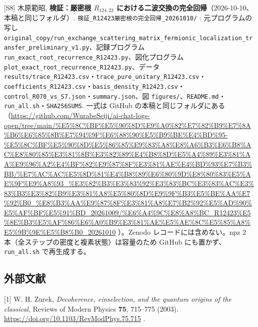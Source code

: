 \documentclass[
  a4paper,
]{ltjsarticle}
\begin{document}
{[}S8{]} 木原範昭, \textbf{検証：厳密根 \(R_{124,23}\)
における二波交換の完全回帰}（2026-10-10、本稿と同じフォルダ）.
\texttt{検証\_\allowbreak{}R12423厳密根の完全回帰\_\allowbreak{}20261010/\allowbreak{}} : 元プログラムの写し
\texttt{original\_\allowbreak{}copy/\allowbreak{}run\_\allowbreak{}exchange\_\allowbreak{}scattering\_\allowbreak{}matrix\_\allowbreak{}fermionic\_\allowbreak{}localization\_\allowbreak{}transfer\_\allowbreak{}preliminary\_\allowbreak{}v1.py}、記録プログラム
\texttt{run\_\allowbreak{}exact\_\allowbreak{}root\_\allowbreak{}recurrence\_\allowbreak{}R12423.py}、図化プログラム
\texttt{plot\_\allowbreak{}exact\_\allowbreak{}root\_\allowbreak{}recurrence\_\allowbreak{}R12423.py}、データ
\texttt{results/\allowbreak{}trace\_\allowbreak{}R12423.csv}・\texttt{trace\_\allowbreak{}pure\_\allowbreak{}unitary\_\allowbreak{}R12423.csv}・\texttt{coefficients\_\allowbreak{}R12423.csv}・\texttt{basis\_\allowbreak{}density\_\allowbreak{}R12423.csv}・\texttt{control\_\allowbreak{}R070\_\allowbreak{}vs\_\allowbreak{}S7.json}・\texttt{summary.json}、図
\texttt{figures/\allowbreak{}}、\texttt{README.md}・\texttt{run\_\allowbreak{}all.sh}・\texttt{SHA256SUMS}.
一式は GitHub
の本稿と同じフォルダにある（\url{https://github.com/WurabeSeiji/ai-chat-logs-open/tree/main/\%E5\%8C\%BF\%E5\%90\%8D\%E9\%A0\%82\%E7\%82\%B9\%E7\%8A\%B6\%E6\%85\%8B\%E7\%94\%9F\%E6\%88\%90\%E5\%B9\%BE\%E4\%BD\%95-\%E5\%8C\%BF\%E5\%90\%8D\%E5\%86\%85\%E9\%83\%A8\%E8\%A6\%B3\%E6\%B8\%AC\%E8\%80\%85\%E3\%81\%8B\%E3\%82\%89\%E4\%B8\%8D\%E5\%A4\%89\%E3\%81\%AA\%E9\%96\%A2\%E4\%BF\%82\%E9\%87\%8F\%E3\%81\%AE\%E4\%BD\%93\%E7\%B3\%BB/\%E7\%AC\%AC\%E5\%8D\%81\%E4\%B8\%89\%E6\%80\%9D\%E8\%80\%83\%E5\%AE\%9F\%E9\%A8\%93\_\%E3\%82\%B3\%E3\%83\%92\%E3\%83\%BC\%E3\%83\%AC\%E3\%83\%B3\%E3\%82\%B9\%E3\%81\%A8\%E5\%80\%8D\%E9\%9F\%B3\%E5\%BE\%AA\%E7\%92\%B0\_\%E8\%B3\%AA\%E9\%87\%8F\%E3\%81\%A8\%E7\%B2\%92\%E5\%AD\%90\%E5\%AF\%BF\%E5\%91\%BD\_20261009/\%E6\%A4\%9C\%E8\%A8\%BC\_R12423\%E5\%8E\%B3\%E5\%AF\%86\%E6\%A0\%B9\%E3\%81\%AE\%E5\%AE\%8C\%E5\%85\%A8\%E5\%9B\%9E\%E5\%B8\%B0\_20261010}
）。Zenodo レコードには含めない。npz 2
本（全ステップの密度と複素状態）は容量のため GitHub
にも置かず、\texttt{run\_\allowbreak{}all.sh} で再生成する。

\subsection{外部文献}\label{ux5916ux90e8ux6587ux732e}

{[}1{]} W. H. Zurek, \emph{Decoherence, einselection, and the quantum
origins of the classical}, Reviews of Modern Physics \textbf{75},
715--775 (2003). \url{https://doi.org/10.1103/RevModPhys.75.715} .
\end{document}
